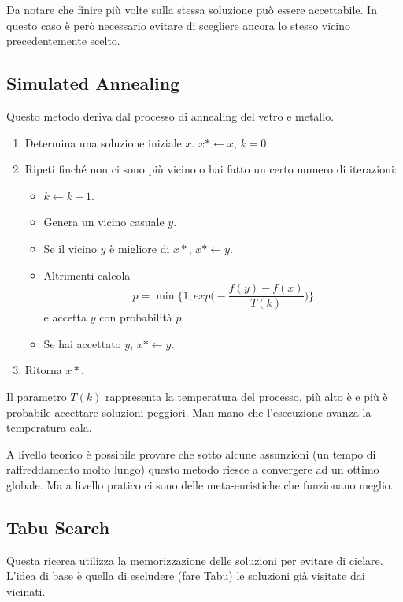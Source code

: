 \noindent Da notare che finire più volte sulla stessa soluzione può essere accettabile. In questo caso è però necessario evitare di scegliere ancora lo stesso vicino precedentemente scelto.

\subsection{Simulated Annealing}

Questo metodo deriva dal processo di annealing del vetro e metallo.

\begin{enumerate}
	\item Determina una soluzione iniziale $x$. $x* \leftarrow x$, $k=0$.
	\item Ripeti finché non ci sono più vicino o hai fatto un certo numero di iterazioni:
		\begin{itemize}
			\item $k \leftarrow k +1$.
			\item Genera un vicino casuale $y$.
			\item Se il vicino $y$ è migliore di $x*$, $x* \leftarrow y$.
			\item Altrimenti calcola
			$$
			p = \min \bigg\{1, exp\bigg(-\frac{f(y)-f(x)}{T(k)}\bigg)\bigg\}
			$$
			e accetta $y$ con probabilità $p$.
			\item Se hai accettato $y$, $x* \leftarrow y$.
		\end{itemize}
	\item Ritorna $x*$.
\end{enumerate}

\noindent Il parametro $T(k)$ rappresenta la temperatura del processo, più alto è e più è probabile accettare soluzioni peggiori. Man mano che l'esecuzione avanza la temperatura cala.

A livello teorico è possibile provare che sotto alcune assunzioni (un tempo di raffreddamento molto lungo) questo metodo riesce a convergere ad un ottimo globale.
Ma a livello pratico ci sono delle meta-euristiche che funzionano meglio.

\subsection{Tabu Search}

Questa ricerca utilizza la memorizzazione delle soluzioni per evitare di ciclare.
L'idea di base è quella di escludere (fare Tabu) le soluzioni già visitate dai vicinati.

